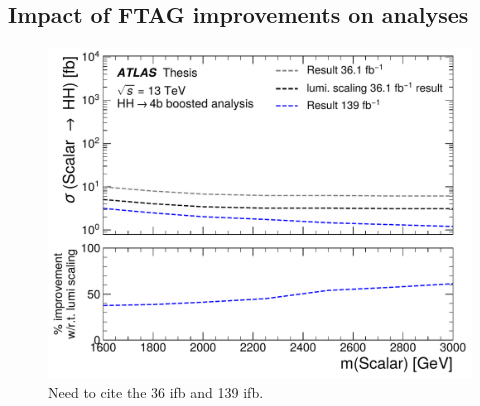 \subsection{Impact of FTAG improvements on analyses}

\begin{figure}
\centering
\includegraphics[width=\textwidth]{figures/my_dihiggs/HH4b-boosted-vr-trk-jet-improvements.pdf}
\caption{Need to cite the 36 ifb and 139 ifb.}
\label{fig:boosted-vr-trk-jet-improvements}
\end{figure}
